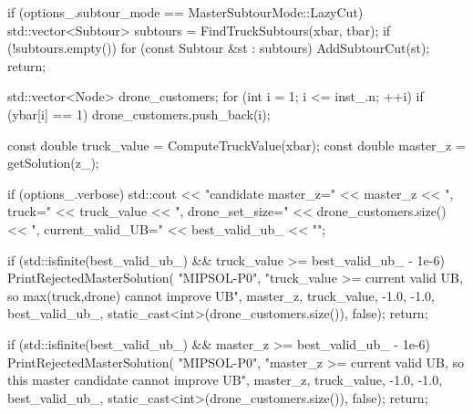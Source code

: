 {{{{                if (options_.subtour_mode == MasterSubtourMode::LazyCut)
                {
                    std::vector<Subtour> subtours = FindTruckSubtours(xbar, tbar);
                    if (!subtours.empty())
                    {
                        for (const Subtour &st : subtours)
                        {
                            AddSubtourCut(st);
                        }
                        return;
                    }
                }

                std::vector<Node> drone_customers;
                for (int i = 1; i <= inst_.n; ++i)
                {
                    if (ybar[i] == 1)
                    {
                        drone_customers.push_back(i);
                    }
                }

                const double truck_value = ComputeTruckValue(xbar);
                const double master_z = getSolution(z_);

                if (options_.verbose)
                {
                    std::cout << "\n[MIPSOL] candidate master_z=" << master_z
                              << ", truck=" << truck_value
                              << ", drone_set_size=" << drone_customers.size()
                              << ", current_valid_UB=" << best_valid_ub_
                              << "\n";
                }

                if (std::isfinite(best_valid_ub_) &&
                    truck_value >= best_valid_ub_ - 1e-6)
                {
                    PrintRejectedMasterSolution(
                        "MIPSOL-P0",
                        "truck_value >= current valid UB, so max(truck,drone) cannot improve UB",
                        master_z,
                        truck_value,
                        -1.0,
                        -1.0,
                        best_valid_ub_,
                        static_cast<int>(drone_customers.size()),
                        false);
                    return;
                }

                if (std::isfinite(best_valid_ub_) &&
                    master_z >= best_valid_ub_ - 1e-6)
                {
                    PrintRejectedMasterSolution(
                        "MIPSOL-P0",
                        "master_z >= current valid UB, so this master candidate cannot improve UB",
                        master_z,
                        truck_value,
                        -1.0,
                        -1.0,
                        best_valid_ub_,
                        static_cast<int>(drone_customers.size()),
                        false);
                    return;
                }

}}}}
